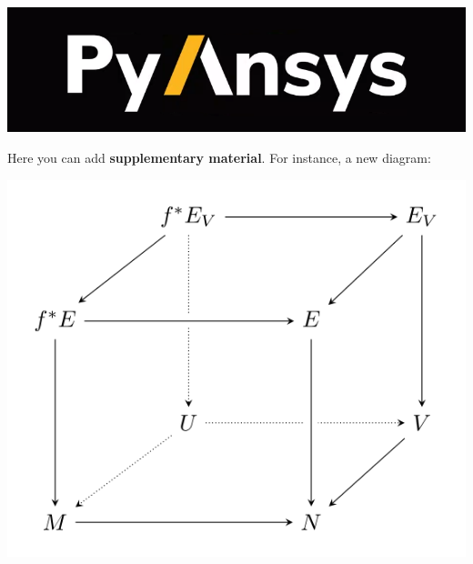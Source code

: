 \documentclass[a0paper,fleqn]{src/betterposter}
\begin{document}
{%
\vfill

\includegraphics[width=\textwidth]{img/general/pyansys_dark}\\

}{

Here you can add \textbf{supplementary material}. For instance, a new diagram:
\begin{center}
\includegraphics[width=\textwidth]{img/example/tikzexample2}
\end{center}

}
\end{document}
